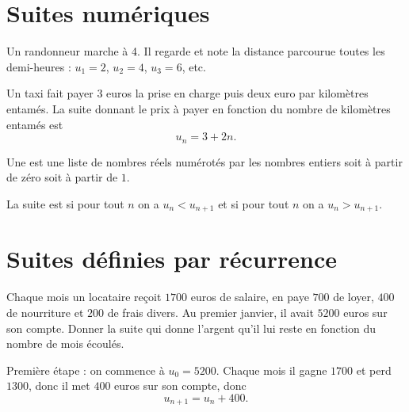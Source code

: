 
\section{Suites numériques}

\begin{example}
    Un randonneur marche à \unit{4}{\kilo\meter\per\hour}. Il regarde et note la distance parcourue toutes les demi-heures : \( u_1=2\), \( u_2=4\), \( u_3=6\), etc.
\end{example}

\begin{example}
    Un taxi fait payer \( 3\) euros la prise en charge puis deux euro par kilomètres entamés. La suite donnant le prix à payer en fonction du nombre de kilomètres entamés est
    \begin{equation}
        u_n=3+2n.
    \end{equation}
\end{example}

\begin{definition}
    Une  est une liste de nombres réels numérotés par les nombres entiers soit à partir de zéro soit à partir de \( 1\).

    La suite est  si pour tout \( n\) on a \( u_n<u_{n+1}\) et  si pour tout \( n\) on a \( u_n>u_{n+1}\).
\end{definition}

\section{Suites définies par récurrence}

\begin{example}
    Chaque mois un locataire reçoit \( 1700\) euros de salaire, en paye \( 700\) de loyer, \( 400\) de nourriture et \( 200\) de frais divers. Au premier janvier, il avait \( 5200\) euros sur son compte. Donner la suite qui donne l'argent qu'il lui reste en fonction du nombre de mois écoulés.

    Première étape : on commence à \( u_0=5200\). Chaque mois il gagne \( 1700\) et perd \( 1300\), donc il met \( 400\) euros sur son compte, donc
    \begin{equation}
        u_{n+1}=u_n+400.
    \end{equation}
\end{example}

